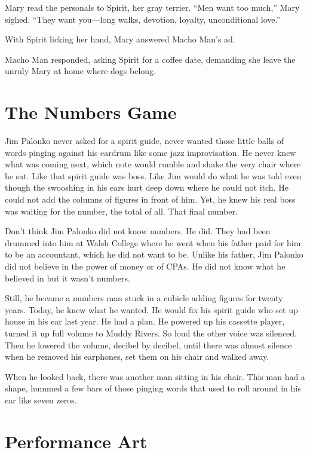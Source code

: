 \documentclass[twoside,10pt]{book}
\begin{document}
Mary read the personals to Spirit, her gray terrier. ``Men want too
much,'' Mary sighed. ``They want you---long walks, devotion, loyalty,
unconditional love.''

With Spirit licking her hand, Mary answered Macho Man's ad.

Macho Man responded, asking Spirit for a coffee date, demanding she
leave the unruly Mary at home where dogs belong.



\cleardoublepage
\chapter{The Numbers Game}

Jim Palonko never asked for a spirit guide, never wanted those little
balls of words pinging against his eardrum like some jazz improvisation.
He never knew what was coming next, which note would rumble and shake
the very chair where he sat. Like that spirit guide was boss. Like Jim
would do what he was told even though the swooshing in his ears hurt
deep down where he could not itch. He could not add the columns of
figures in front of him. Yet, he knew his real boss was waiting for the
number, the total of all. That final number.

Don't think Jim Palonko did not know numbers. He did. They had been
drummed into him at Walsh College where he went when his father paid for
him to be an accountant, which he did not want to be. Unlike his father,
Jim Palonko did not believe in the power of money or of CPAs. He did not
know what he believed in but it wasn't numbers.

Still, he became a numbers man stuck in a cubicle adding figures for
twenty years. Today, he knew what he wanted. He would fix his spirit
guide who set up house in his ear last year. He had a plan. He powered
up his cassette player, turned it up full volume to Muddy Rivers. So
loud the other voice was silenced. Then he lowered the volume, decibel
by decibel, until there was almost silence when he removed his
earphones, set them on his chair and walked away.

When he looked back, there was another man sitting in his chair. This
man had a shape, hummed a few bars of those pinging words that used to
roll around in his ear like seven zeros.



\cleardoublepage
\chapter{Performance Art}
\end{document}
